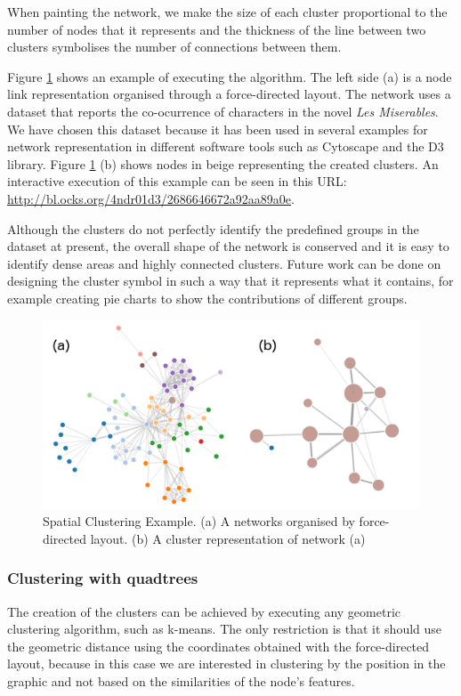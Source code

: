 When painting the network, we make the size of each cluster proportional to the number of nodes that it represents and the thickness of the line between two clusters symbolises the number of connections between them.


Figure \ref{fig:spatial_clustring} shows an example of executing the algorithm. The left side (a) is a node link representation organised through a force-directed layout. The network uses a dataset that reports the co-ocurrence of characters in the novel \emph{Les Miserables}. We have chosen this dataset because it has been used in several examples for network representation in different software tools such as Cytoscape and the D3 library. Figure \ref{fig:spatial_clustring} (b) shows nodes in beige representing the created clusters. An interactive execution of this example can be seen in this URL: \url{http://bl.ocks.org/4ndr01d3/2686646672a92aa89a0e}. 

Although the clusters do not perfectly identify the predefined groups in the dataset at present, the overall shape of the network is conserved and it is easy to identify dense areas and highly connected clusters. Future work can be done on designing the cluster symbol in such a way that it represents what it contains, for example creating pie charts to show the contributions of different groups.

\begin{figure}[ht]
\centering
\includegraphics[width=\textwidth]{figures/spatial_clustring.png}
\caption[Spatial Clustering Example.]{Spatial Clustering Example. (a) A networks organised by force-directed layout. (b) A cluster representation of network (a)
\label{fig:spatial_clustring}}
\end{figure}

\subsubsection{Clustering with quadtrees}
The creation of the clusters can be achieved by executing any geometric clustering algorithm, such as k-means. The only restriction is that it should use the geometric distance using the coordinates obtained with the force-directed layout, because in this case we are interested in clustering by the position in the graphic and not based on the similarities of the node's features.

